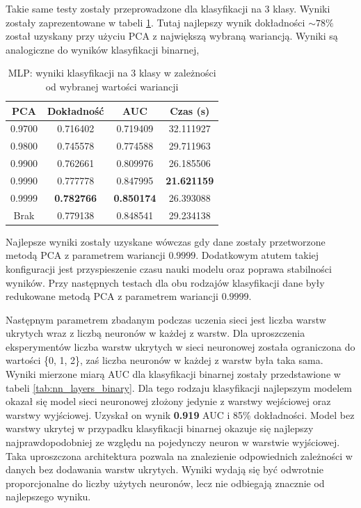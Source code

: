 \documentclass[a4paper, twoside, 11pt, openright]{article}
\begin{document}
Takie same testy zostały przeprowadzone dla klasyfikacji na 3 klasy. Wyniki zostały zaprezentowane w tabeli \ref{tab:nn_pca_discrete}. Tutaj najlepszy wynik dokładności $\sim{78\%}$ został uzyskany przy użyciu PCA z największą wybraną wariancją. Wyniki są analogiczne do wyników klasyfikacji binarnej, 

\begin{table}[H]
    \centering
    \begin{tabular}{|c|c|c|c|}
    \hline
        \textbf{PCA} & \textbf{Dokładność} &  \textbf{AUC} &  \textbf{Czas (s)} \\ \hline
0.9700               &  0.716402 &  0.719409 &   32.111927 \\ \hline
0.9800               &  0.745578 &  0.774588 &   29.711963 \\ \hline
0.9900               &  0.762661 &  0.809976 &   26.185506 \\ \hline
0.9990              &  0.777778 &  0.847995 &   \textbf{21.621159} \\ \hline
0.9999             &  \textbf{0.782766} &  \textbf{0.850174} &   26.393088 \\ \hline
Brak                &  0.779138 &  0.848541 &   29.234138 \\ \hline
    \end{tabular}
    \caption{MLP: wyniki klasyfikacji na 3 klasy w zależności od wybranej wartości wariancji}
    \label{tab:nn_pca_discrete}
\end{table}

Najlepsze wyniki zostały uzyskane wówczas gdy dane zostały przetworzone metodą PCA z parametrem wariancji $0.9999$. Dodatkowym atutem takiej konfiguracji jest przyspieszenie czasu nauki modelu oraz poprawa stabilności wyników.  Przy następnych testach dla obu rodzajów klasyfikacji dane były redukowane metodą PCA z parametrem wariancji $0.9999$.

\bigskip

Następnym parametrem zbadanym podczas uczenia sieci jest liczba warstw ukrytych wraz z liczbą neuronów w każdej z warstw. Dla uproszczenia eksperymentów liczba warstw ukrytych w sieci neuronowej została ograniczona do wartości \{0, 1, 2\}, zaś liczba neuronów w każdej z warstw była taka sama. Wyniki mierzone miarą AUC dla klasyfikacji binarnej zostały przedstawione w tabeli \ref{tab:nn_layers_binary}. Dla tego rodzaju klasyfikacji najlepszym modelem okazał się model sieci neuronowej złożony jedynie z warstwy wejściowej oraz warstwy wyjściowej. Uzyskał on wynik \textbf{0.919} AUC i 85\% dokładności. Model bez warstwy ukrytej w przypadku klasyfikacji binarnej okazuje się najlepszy najprawdopodobniej ze względu na pojedynczy neuron w warstwie wyjściowej. Taka uproszczona architektura pozwala na znalezienie odpowiednich zależności w danych bez dodawania warstw ukrytych. Wyniki wydają się być odwrotnie proporcjonalne do liczby użytych neuronów, lecz nie odbiegają znacznie od najlepszego wyniku.
\end{document}
